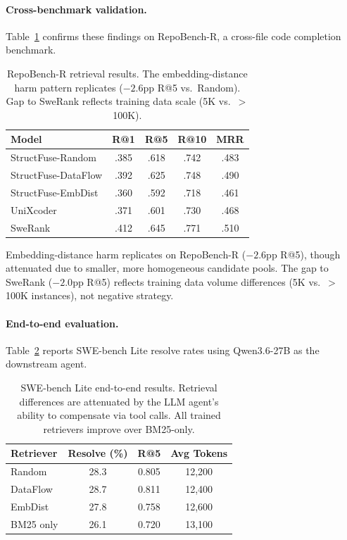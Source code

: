\documentclass[11pt,a4paper]{article}
\begin{document}
\paragraph{Cross-benchmark validation.}
Table~\ref{tab:repobench} confirms these findings on RepoBench-R, a cross-file code completion benchmark.

\begin{table}[t]
\centering
\small
\begin{tabular}{lcccc}
\toprule
\textbf{Model} & \textbf{R@1} & \textbf{R@5} & \textbf{R@10} & \textbf{MRR} \\
\midrule
StructFuse-Random & .385 & .618 & .742 & .483 \\
StructFuse-DataFlow & .392 & .625 & .748 & .490 \\
StructFuse-EmbDist & .360 & .592 & .718 & .461 \\
\midrule
UniXcoder & .371 & .601 & .730 & .468 \\
SweRank & .412 & .645 & .771 & .510 \\
\bottomrule
\end{tabular}
\caption{RepoBench-R retrieval results. The embedding-distance harm pattern replicates ($-2.6$pp R@5 vs.\ Random). Gap to SweRank reflects training data scale (5K vs.\ $>$100K).}
\label{tab:repobench}
\end{table}

Embedding-distance harm replicates on RepoBench-R ($-2.6$pp R@5), though attenuated due to smaller, more homogeneous candidate pools.
The gap to SweRank ($-2.0$pp R@5) reflects training data volume differences (5K vs.\ $>$100K instances), not negative strategy.

\paragraph{End-to-end evaluation.}
Table~\ref{tab:e2e} reports SWE-bench Lite resolve rates using Qwen3.6-27B as the downstream agent.

\begin{table}[t]
\centering
\small
\begin{tabular}{lccc}
\toprule
\textbf{Retriever} & \textbf{Resolve (\%)} & \textbf{R@5} & \textbf{Avg Tokens} \\
\midrule
Random & 28.3 & 0.805 & 12,200 \\
DataFlow & 28.7 & 0.811 & 12,400 \\
EmbDist & 27.8 & 0.758 & 12,600 \\
BM25 only & 26.1 & 0.720 & 13,100 \\
\bottomrule
\end{tabular}
\caption{SWE-bench Lite end-to-end results. Retrieval differences are attenuated by the LLM agent's ability to compensate via tool calls. All trained retrievers improve over BM25-only.}
\label{tab:e2e}
\end{table}
\end{document}

